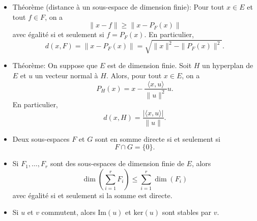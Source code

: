 \documentclass{article}
\begin{document}
\begin{itemize}[label=$\ast$]
\item Théorème (distance à un sous-espace de dimension finie): Pour tout $x \in E$ et tout $f \in F$, on a \[\| x - f \| \geq \| x - P_F(x) \| \]avec égalité si et seulement si $f = P_F(x)$. En particulier, \[d(x, F) = \| x - P_F(x) \| = \sqrt{\| x \|^2 - \| P_F(x) \|^2}.\]

\item Théorème: On suppose que $E$ est de dimension finie. Soit $H$ un hyperplan de $E$ et $u$ un vecteur normal à $H$. Alors, pour tout $x \in E$, on a \[P_H(x) = x - \frac{\langle x, u \rangle}{\| u \|^2} u.\]En particulier, \[d(x, H) = \frac{|\langle x, u \rangle|}{\| u \|}.\]

\begin{center} 
\end{center}


\item Deux sous-espaces $F$ et $G$ sont en somme directe si et seulement si \[F \cap G = \{0\}.\]

\item Si $F_1, \ldots, F_r$ sont des sous-espaces de dimension finie de $E$, alors \[\dim\left(\sum_{i=1}^{r} F_i\right) \leq \sum_{i=1}^{r} \dim(F_i)\]avec égalité si et seulement si la somme est directe.

\item Si $u$ et $v$ commutent, alors $\text{Im}(u)$ et $\text{ker}(u)$ sont stables par $v$.


\end{itemize}
\end{document}
